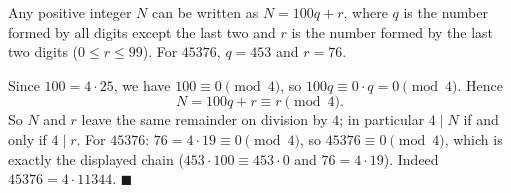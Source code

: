 Any positive integer $N$ can be written as $N=100q+r$, where $q$ is the number formed by all digits except the last two and $r$ is the number formed by the last two digits ($0\le r\le99$). For $45376$, $q=453$ and $r=76$.

Since $100=4\cdot25$, we have $100\equiv0\pmod4$, so $100q\equiv0\cdot q=0\pmod4$. Hence
\[
N=100q+r\equiv r\pmod4 .
\]
So $N$ and $r$ leave the same remainder on division by $4$; in particular $4\mid N$ if and only if $4\mid r$. For $45376$: $76=4\cdot19\equiv0\pmod4$, so $45376\equiv0\pmod4$, which is exactly the displayed chain ($453\cdot100\equiv453\cdot0$ and $76=4\cdot19$). Indeed $45376=4\cdot11344$. $\blacksquare$
